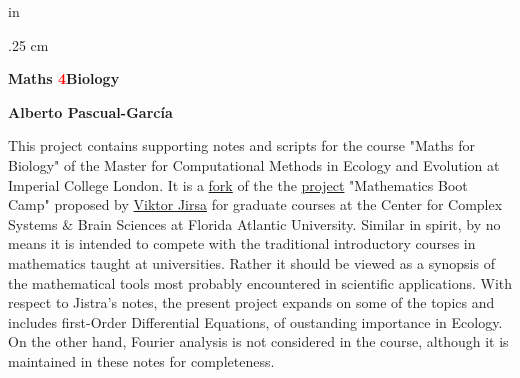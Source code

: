 \documentclass[11pt]{article}
\begin{document}
\def\thcr{\cr\noalign{\vskip.3cm}}

\newlength{\eqbreite}\setlength{\eqbreite}{\textwidth}

\addtolength{\eqbreite}{-1.5cm}



\long\def\bnn#1\enn{$$\begin{minipage}{\eqbreite}

\vskip .1cm \let\\ = \thcr \halign{$\displaystyle{##}$

\hfil && $\displaystyle{##}$\hfil \cr#1 \cr}

\vskip.3cm \end{minipage}$$}



 in

\parskip .25 cm












\thispagestyle{empty}

\svs

\begin{center}

\begin{huge}
  \textrm{\textbf{Maths	{\textcolor{red}{\Huge 4}}Biology}}\\
\end{huge} 
\vspace*{1cm}
\begin{Large}
  {\bf Alberto Pascual-Garc{\'i}a} \\
\end{Large}

\end{center} \vs



\normalsize
This project contains supporting notes and scripts for the course "Maths for Biology"
of the Master for Computational Methods in Ecology and Evolution at 
Imperial College London. It is a \href{}{fork} of the the 
\href{https://github.com/vjirsa/bootcamp}{project} "Mathematics Boot Camp" proposed
by \href{http://ins.univ-amu.fr/research-teams/team-member/v.jirsa/}{Viktor Jirsa}
for graduate courses at the Center for Complex Systems \& Brain Sciences at Florida
Atlantic University. Similar in spirit, by no means it is intended to compete with the
traditional introductory courses in mathematics taught at universities. Rather it should
be viewed as a synopsis of the mathematical tools most probably encountered in scientific
applications. With respect to Jistra's notes, the present project expands on
some of the topics and includes first-Order Differential Equations, of oustanding importance
in Ecology. On the other hand, Fourier analysis is not considered in the course, although it is maintained
in these notes for completeness.
\end{document}
